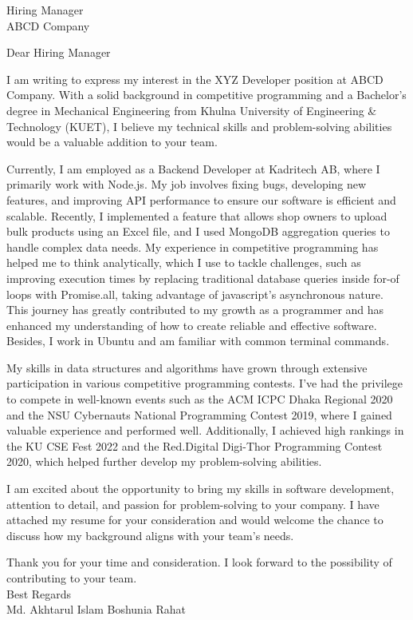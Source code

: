 \documentclass[a4paper,11pt]{letter}
\date{November 11, 2024} %
\begin{document}
\begin{letter}{Hiring Manager \\ ABCD Company}

\opening
{Dear Hiring Manager}

I am writing to express my interest in the XYZ Developer position at ABCD Company. With a solid background in competitive programming and a Bachelor’s degree in Mechanical Engineering from Khulna University of Engineering \& Technology (KUET), I believe my technical skills and problem-solving abilities would be a valuable addition to your team.

Currently, I am employed as a Backend Developer at Kadritech AB, where I primarily work with Node.js. My job involves fixing bugs, developing new features, and improving API performance to ensure our software is efficient and scalable. Recently, I implemented a feature that allows shop owners to upload bulk products using an Excel file, and I used MongoDB aggregation queries to handle complex data needs. My experience in competitive programming has helped me to think analytically, which I use to tackle challenges, such as improving execution times by replacing traditional database queries inside for-of loops with Promise.all, taking advantage of javascript's asynchronous nature. This journey has greatly contributed to my growth as a programmer and has enhanced my understanding of how to create reliable and effective software. Besides, I work in Ubuntu and am familiar with common terminal commands.

My skills in data structures and algorithms have grown through extensive participation in various competitive programming contests. I’ve had the privilege to compete in well-known events such as the ACM ICPC Dhaka Regional 2020 and the NSU Cybernauts National Programming Contest 2019, where I gained valuable experience and performed well. Additionally, I achieved high rankings in the KU CSE Fest 2022 and the Red.Digital Digi-Thor Programming Contest 2020, which helped further develop my problem-solving abilities.


I am excited about the opportunity to bring my skills in software development, attention to detail, and passion for problem-solving to your company. I have attached my resume for your consideration and would welcome the chance to discuss how my background aligns with your team’s needs.

Thank you for your time and consideration. I look forward to the possibility of contributing to your team.\\

Best Regards\\
Md. Akhtarul Islam Boshunia Rahat

\end{letter}
\end{document}
